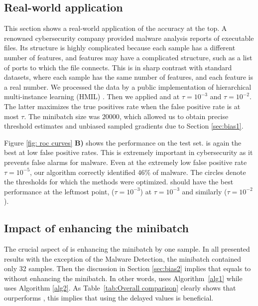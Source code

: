 \subsection{Real-world application}

This section shows a real-world application of the accuracy at the top. A renowned cybersecurity company provided malware analysis reports of executable files. Its structure is highly complicated because each sample has a different number of features, and features may have a complicated structure, such as a list of ports to which the file connects. This is in sharp contrast with standard datasets, where each sample has the same number of features, and each feature is a real number. We processed the data by a public implementation of hierarchical multi-instance learning (HMIL) \cite{pevny2017using}. Then we applied \DeepTopPush and \PatMatNP at $\tau=10^{-3}$ and $\tau=10^{-2}$. The latter maximizes the true positives rate when the false positive rate is at most $\tau$. The minibatch size was $20000$, which allowed us to obtain precise threshold estimates and unbiased sampled gradients due to Section \ref{sec:bias1}.

Figure \ref{fig: roc curves} \textbf{B)} shows the performance on the test set. \DeepTopPush is again the best at low false positive rates. This is extremely important in cybersecurity as it prevents false alarms for malware. Even at the extremely low false positive rate $\tau=10^{-5}$, our algorithm correctly identified $46\%$ of malware. The circles denote the thresholds for which the methods were optimized. \DeepTopPush should have the best performance at the leftmost point, \PatMatNP ($\tau=10^{-3}$) at $\tau=10^{-3}$ and similarly \PatMatNP($\tau=10^{-2}$).

\subsection{Impact of enhancing the minibatch}\label{sec:delay}

The crucial aspect of \DeepTopPush is enhancing the minibatch by one sample. In all presented results with the exception of the Malware Detection, the minibatch contained only 32 samples. Then the discussion in Section \ref{sec:bias2} implies that \PatMatNP equals to \DeepTopPush without enhancing the minibatch. In other words, \PatMatNP uses Algorithm~\ref{alg1} while \DeepTopPush uses Algorithm \ref{alg2}. As Table~\ref{tab:Overall comparison} clearly shows that \DeepTopPush ourperforms \PatMatNP, this implies that using the delayed values is beneficial.

